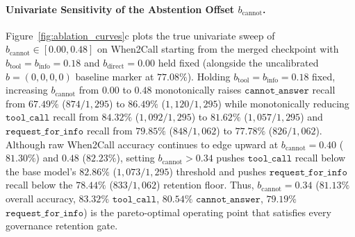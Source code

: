 \documentclass[10pt,twocolumn]{article}
\begin{document}
\paragraph{Univariate Sensitivity of the Abstention Offset $b_{\text{cannot}}$.}
Figure~\ref{fig:ablation_curves}c plots the true univariate sweep of $b_{\text{cannot}} \in [0.00, 0.48]$ on When2Call starting from the merged checkpoint with $b_{\text{tool}} = b_{\text{info}} = 0.18$ and $b_{\text{direct}} = 0.00$ held fixed (alongside the uncalibrated $b = (0,0,0,0)$ baseline marker at $77.08\%$). Holding $b_{\text{tool}} = b_{\text{info}} = 0.18$ fixed, increasing $b_{\text{cannot}}$ from $0.00$ to $0.48$ monotonically raises $\texttt{cannot\_answer}$ recall from $67.49\%$ ($874/1{,}295$) to $86.49\%$ ($1{,}120/1{,}295$) while monotonically reducing $\texttt{tool\_call}$ recall from $84.32\%$ ($1{,}092/1{,}295$) to $81.62\%$ ($1{,}057/1{,}295$) and $\texttt{request\_for\_info}$ recall from $79.85\%$ ($848/1{,}062$) to $77.78\%$ ($826/1{,}062$). Although raw When2Call accuracy continues to edge upward at $b_{\text{cannot}} = 0.40$ ($81.30\%$) and $0.48$ ($82.23\%$), setting $b_{\text{cannot}} > 0.34$ pushes $\texttt{tool\_call}$ recall below the base model's $82.86\%$ ($1{,}073/1{,}295$) threshold and pushes $\texttt{request\_for\_info}$ recall below the $78.44\%$ ($833/1{,}062$) retention floor. Thus, $b_{\text{cannot}} = 0.34$ ($81.13\%$ overall accuracy, $83.32\%$ $\texttt{tool\_call}$, $80.54\%$ $\texttt{cannot\_answer}$, $79.19\%$ $\texttt{request\_for\_info}$) is the pareto-optimal operating point that satisfies every governance retention gate.
\end{document}

